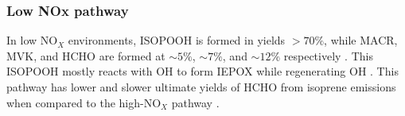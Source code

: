       
       
      
    
    \subsubsection{Low NOx pathway}
      
      In low NO$_X$ environments, ISOPOOH is formed in yields $> 70\%$, while MACR, MVK, and HCHO are formed at $\sim 5\%$, $\sim 7\%$, and $\sim 12\%$ respectively \parencite{Paulot2009b,Mao2013}.
      This ISOPOOH mostly reacts with OH to form IEPOX while regenerating OH \parencite{Mao2013}.
      This pathway has lower and slower ultimate yields of HCHO from isoprene emissions when compared to the high-NO$_X$ pathway \parencite{Palmer2006}.
      
